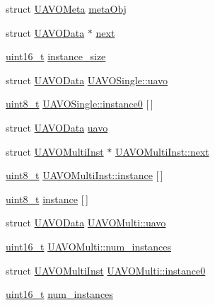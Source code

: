 \begin{DoxyCompactItemize}
\item 
struct \hyperlink{struct_u_a_v_o_meta}{U\-A\-V\-O\-Meta} \hyperlink{group___u_a_v_ga901520d72fd09e2e09ca22e17fd95b63}{meta\-Obj}
\item 
struct \hyperlink{struct_u_a_v_o_data}{U\-A\-V\-O\-Data} $\ast$ \hyperlink{group___u_a_v_ga0463912be4bb882cee5d3d70c664b698}{next}
\item 
\hyperlink{stdint_8h_a273cf69d639a59973b6019625df33e30}{uint16\-\_\-t} \hyperlink{group___u_a_v_gae673ed9d3b1b0cb5109c647692581785}{instance\-\_\-size}
\item 
struct \hyperlink{struct_u_a_v_o_data}{U\-A\-V\-O\-Data} \hyperlink{group___u_a_v_gadc5ae49c5f1cc194e3df35a0652d9a13}{U\-A\-V\-O\-Single\-::uavo}
\item 
\hyperlink{stdint_8h_aba7bc1797add20fe3efdf37ced1182c5}{uint8\-\_\-t} \hyperlink{group___u_a_v_ga411e3c7c88a81c2f1cd74cab9a3ab5ec}{U\-A\-V\-O\-Single\-::instance0} \mbox{[}$\,$\mbox{]}
\item 
struct \hyperlink{struct_u_a_v_o_data}{U\-A\-V\-O\-Data} \hyperlink{group___u_a_v_gae867d32faead3f589ab1ceb9ecf3e3fd}{uavo}
\item 
struct \hyperlink{struct_u_a_v_o_multi_inst}{U\-A\-V\-O\-Multi\-Inst} $\ast$ \hyperlink{group___u_a_v_ga571693c984fd7e8e845fe57fca2d21d9}{U\-A\-V\-O\-Multi\-Inst\-::next}
\item 
\hyperlink{stdint_8h_aba7bc1797add20fe3efdf37ced1182c5}{uint8\-\_\-t} \hyperlink{group___u_a_v_gab48732994d9762f9493940dc57e60f8b}{U\-A\-V\-O\-Multi\-Inst\-::instance} \mbox{[}$\,$\mbox{]}
\item 
\hyperlink{stdint_8h_aba7bc1797add20fe3efdf37ced1182c5}{uint8\-\_\-t} \hyperlink{group___u_a_v_ga9eba2b5756444f64b374ac6725a8f120}{instance} \mbox{[}$\,$\mbox{]}
\item 
struct \hyperlink{struct_u_a_v_o_data}{U\-A\-V\-O\-Data} \hyperlink{group___u_a_v_ga718e24f6eadeb8508309dcb0eeeb9bda}{U\-A\-V\-O\-Multi\-::uavo}
\item 
\hyperlink{stdint_8h_a273cf69d639a59973b6019625df33e30}{uint16\-\_\-t} \hyperlink{group___u_a_v_ga9502c6a24b6d21d6ec4e48fbe166f1c4}{U\-A\-V\-O\-Multi\-::num\-\_\-instances}
\item 
struct \hyperlink{struct_u_a_v_o_multi_inst}{U\-A\-V\-O\-Multi\-Inst} \hyperlink{group___u_a_v_ga2512d4c2267924e345079a69ae78b209}{U\-A\-V\-O\-Multi\-::instance0}
\item 
\hyperlink{stdint_8h_a273cf69d639a59973b6019625df33e30}{uint16\-\_\-t} \hyperlink{group___u_a_v_ga05eb394d494b0c5d3a579c1d9e5081d2}{num\-\_\-instances}
\end{DoxyCompactItemize}


